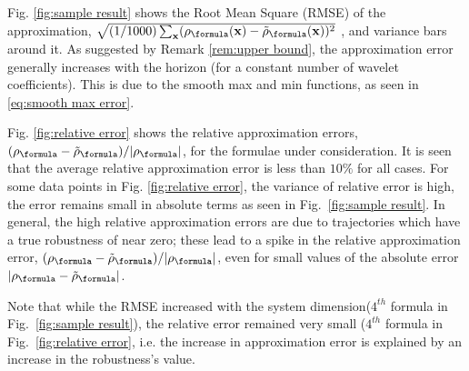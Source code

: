 Fig. \ref{fig:sample result} shows the Root Mean Square (RMSE) of the approximation, $\sqrt{(1/1000)\sum_{\sstraj}(\robf(\sstraj)-\srobf(\sstraj))^2}$
, and variance bars around it.
As suggested by Remark \ref{rem:upper bound}, the approximation error generally increases with the horizon (for a constant number of wavelet coefficients).
This is due to the smooth max and min functions, as seen in \eqref{eq:smooth max error}.

Fig. \ref{fig:relative error} shows the relative approximation errors, $(\robf-\srobf)/|\robf|$, for the formulae under consideration. 
It is seen that the average relative approximation error is less than $10\%$ for all cases. 
For some data points in Fig. \ref{fig:relative error}, the variance of relative error is high, the error remains small in absolute terms as seen in Fig.~\ref{fig:sample result}.
In general, the high relative approximation errors are due to trajectories which have a true robustness of near zero; 
these lead to a spike in the relative approximation error, $(\robf-\srobf)/|\robf|$, even for small values of the absolute error $|\robf-\srobf|$.



Note that while the RMSE  increased with the system dimension($4^{th}$ formula in Fig.~\ref{fig:sample result}), the relative error remained very small ($4^{th}$ formula in Fig.~\ref{fig:relative error}, i.e. the increase in approximation error is explained by an increase in the robustness's value. 

